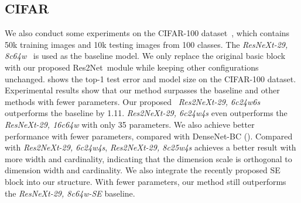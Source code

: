 \documentclass[10pt,journal,cspaper,compsoc]{IEEEtran}
\newcommand{\ourM}{{Res2Net}}
\begin{document}
\subsection{CIFAR}
\label{sec:Experiments_CIFAR}

We also conduct some experiments on the CIFAR-100
dataset~\cite{krizhevsky2009learning},
which contains 50k training images and 10k testing images from 100 classes.
The \emph{ResNeXt-29, 8c64w}~\cite{xie2017aggregated} is used
as the baseline model.
We only replace the original basic block with our proposed \ourM~module
while keeping other configurations unchanged.
 shows the top-1 test error and model size 
on the CIFAR-100 dataset.
Experimental results show that our method surpasses the baseline
and other methods with fewer parameters.
Our proposed ~\emph{Res2NeXt-29, 6c24w6s} outperforms
the baseline by 1.11.
\emph{Res2NeXt-29, 6c24w4s} even outperforms
the \emph{ResNeXt-29, 16c64w} with only 35 parameters.
We also achieve better performance with fewer parameters,
compared with DenseNet-BC ().
Compared with \emph{Res2NeXt-29, 6c24w4s},
\emph{Res2NeXt-29, 8c25w4s} achieves a better result
with more width and cardinality,
indicating that the dimension scale is orthogonal to dimension
width and cardinality.
We also integrate the recently proposed SE block into our structure.
With fewer parameters,
our method still outperforms the \emph{ResNeXt-29, 8c64w-SE} baseline.


\newcommand{\WideResNet}{{Wide ResNet~\cite{Zagoruyko2016WRN}}}
\newcommand{\ResNeXtBase}{{ResNeXt-29, 8c64w~\cite{xie2017aggregated} (base)}}
\newcommand{\ResNeXtLarge}{{ResNeXt-29, 16c64w~\cite{xie2017aggregated}}}
\newcommand{\ResNeXtSEs}{{ResNeXt-29, 8c64w-SE~\cite{hu2018senet}}}
\newcommand{\DenseNetBC}{{DenseNet-BC (k = 40)~\cite{huang2017densely}}}
\newcommand{\RessNetTms}[3]{Res2NeXt-29, {#1}c{#2}w{#3}s}
\newcommand{\RessNetTmsSE}[3]{Res2NeXt-29, {#1}c{#2}w{#3}s-SE}
\end{document}
